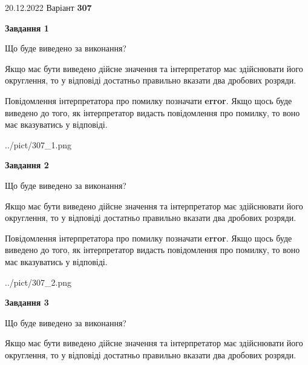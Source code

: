 \documentclass[12pt, ukrainian]{article}
\begin{document}
{20.12.2022 Варіант \No \textbf { 307 }\par}
{
\begin {Large}

{\begin {center}\textbf{Завдання 1}\end {center}}\par
Що буде виведено за виконання? \par

Якщо має бути виведено дійсне значення та інтерпретатор має здійснювати його округлення, 
то у відповіді достатньо правильно вказати два дробових розряди.

Повідомлення інтерпретатора про помилку позначати \textbf{error}.
Якщо щось буде виведено до того, як інтерпретатор видасть повідомлення про помилку, 
то воно має вказуватись у відповіді. \par

\begin{center}
	{../pict/307_1.png}
\end{center}
\newpage

{\begin {center}\textbf{Завдання 2}\end {center}}\par
Що буде виведено за виконання? \par

Якщо має бути виведено дійсне значення та інтерпретатор має здійснювати його округлення, 
то у відповіді достатньо правильно вказати два дробових розряди.

Повідомлення інтерпретатора про помилку позначати \textbf{error}.
Якщо щось буде виведено до того, як інтерпретатор видасть повідомлення про помилку, 
то воно має вказуватись у відповіді. \par

\begin{center}
	{../pict/307_2.png}
\end{center}
\newpage

{\begin {center}\textbf{Завдання 3}\end {center}}\par
Що буде виведено за виконання? \par

Якщо має бути виведено дійсне значення та інтерпретатор має здійснювати його округлення, 
то у відповіді достатньо правильно вказати два дробових розряди.


\end{Large}}
\end{document}
